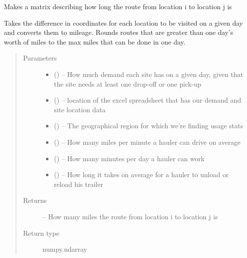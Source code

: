 \documentclass[letterpaper,10pt,english]{sphinxmanual}
\begin{document}
\begin{fulllineitems}
\label{\detokenize{daily-routing:parameters.make_travel_matrix}}
Makes a matrix describing how long the route from location i to location
j is

Takes the difference in coordinates for each location to be visited on a given
day and converts them to mileage. Rounds routes that are greater than one
day's worth of miles to the max miles that can be done in one day.
\begin{quote}\begin{description}
\item[{Parameters}] \leavevmode\begin{itemize}
\item {} 
 () -- How much demand each site has on a given day, given that the site
needs at least one drop-off or one pick-up

\item {} 
 () -- location of the excel spreadsheet that has our demand and site location
data

\item {} 
 () -- The geographical region for which we're finding usage stats

\item {} 
 () -- How many miles per minute a hauler can drive on average

\item {} 
 () -- How many minutes per day a hauler can work

\item {} 
 () -- How long it takes on average for a hauler to unload or reload his trailer

\end{itemize}

\item[{Returns}] \leavevmode
{} -- How many miles the route from location i to location j is

\item[{Return type}] \leavevmode
numpy.ndarray

\end{description}\end{quote}

\end{fulllineitems}
\end{document}

